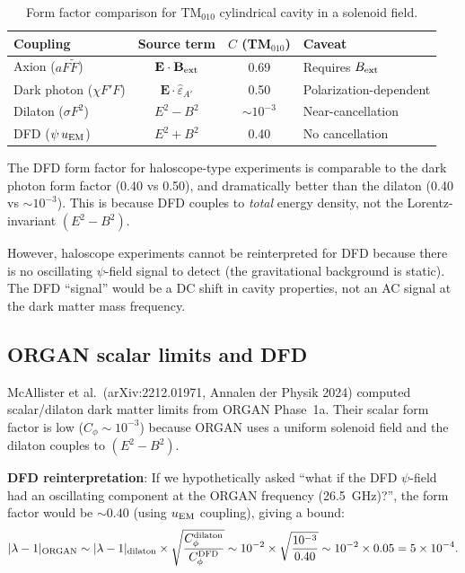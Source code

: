 \documentclass[11pt]{article}
\newcommand{\lbone}{|\lambda - 1|}
\newcommand{\ee}[1]{\times 10^{#1}}
\theoremstyle{definition}
\theoremstyle{remark}
\begin{document}
\begin{table}[H]
\centering
\caption{Form factor comparison for TM$_{010}$ cylindrical cavity
in a solenoid field.}
\label{tab:formfactor_comparison}
\renewcommand{\arraystretch}{1.3}
\begin{tabular}{@{}lccl@{}}
\toprule
\textbf{Coupling} & \textbf{Source term} & \textbf{$C$ (TM$_{010}$)}
& \textbf{Caveat} \\
\midrule
Axion ($aF\tilde{F}$) & $\mathbf{E}\cdot\mathbf{B}_{\rm ext}$
& 0.69 & Requires $B_{\rm ext}$ \\
Dark photon ($\chi F'F$) & $\mathbf{E}\cdot\hat{\varepsilon}_{A'}$
& 0.50 & Polarization-dependent \\
Dilaton ($\sigma F^2$) & $E^2 - B^2$
& $\sim 10^{-3}$ & Near-cancellation \\
DFD ($\psi\,u_{\rm EM}$) & $E^2 + B^2$
& 0.40 & No cancellation \\
\bottomrule
\end{tabular}
\end{table}

The DFD form factor for haloscope-type experiments is comparable
to the dark photon form factor (0.40 vs 0.50), and dramatically
better than the dilaton (0.40 vs $\sim 10^{-3}$). This is because
DFD couples to \emph{total} energy density, not the Lorentz-invariant
$(E^2 - B^2)$.

However, haloscope experiments cannot be reinterpreted for DFD because
there is no oscillating $\psi$-field signal to detect (the gravitational
background is static). The DFD ``signal'' would be a DC shift in cavity
properties, not an AC signal at the dark matter mass frequency.

\subsection{ORGAN scalar limits and DFD}

McAllister et al.\ (arXiv:2212.01971, Annalen der Physik 2024) computed
scalar/dilaton dark matter limits from ORGAN Phase~1a. Their scalar
form factor is low ($C_\phi \sim 10^{-3}$) because ORGAN uses a uniform
solenoid field and the dilaton couples to $(E^2 - B^2)$.

\textbf{DFD reinterpretation}: If we hypothetically asked ``what if the
DFD $\psi$-field had an oscillating component at the ORGAN frequency
(26.5~GHz)?'', the form factor would be $\sim 0.40$ (using $u_{\rm EM}$
coupling), giving a bound:
\begin{equation}
\lbone_{\rm ORGAN} \sim \lbone_{\rm dilaton}\times
\sqrt{\frac{C_\phi^{\rm dilaton}}{C_\phi^{\rm DFD}}}
\sim 10^{-2}\times\sqrt{\frac{10^{-3}}{0.40}}
\sim 10^{-2}\times 0.05 = 5\ee{-4}.
\label{eq:organ_reinterpret}
\end{equation}
\end{document}
